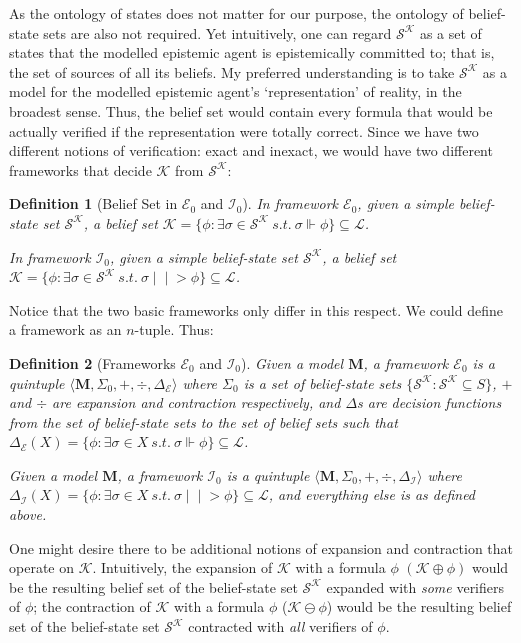 \documentclass[12pt]{article}
\newtheorem{definition}{Definition}[section]
\newcommand{\ver}{\Vdash}
\newcommand{\inever}{\mid \! \mid \!\!>}
\newcommand{\K}{\mathcal{K}}
\newcommand{\SK}{\mathcal{S}^\mathcal{K}}
\begin{document}
\par
As the ontology of states does not matter for our purpose, the ontology of belief-state sets are also not required. Yet intuitively, one can regard $\SK$ as a set of states that the modelled epistemic agent is epistemically committed to; that is, the set of sources of all its beliefs. My preferred understanding is to take $\SK$ as a model for the modelled epistemic agent's `representation' of reality, in the broadest sense. Thus, the belief set would contain every formula that would be actually verified if the representation were totally correct. Since we have two different notions of verification: exact and inexact, we would have two different frameworks that decide $\K$ from $\SK$:
\begin{definition}[Belief Set in $\mathcal{E}_0$ and $\mathcal{I}_0$] In framework $\mathcal{E}_0$, given a simple belief-state set $\SK$, a belief set $\K = \{\phi : \exists \sigma\in\SK \ s.t. \ \sigma \ver \phi \} \subseteq \mathcal{L}$. 
\par
In framework $\mathcal{I}_0$, given a simple belief-state set $\SK$, a belief set $\K = \{\phi : \exists \sigma\in\SK \ s.t. \ \sigma \inever \phi \} \subseteq \mathcal{L}$. 
\end{definition}
Notice that the two basic frameworks only differ in this respect. We could define a framework as an $n$-tuple. Thus:
\begin{definition}[Frameworks $\mathcal{E}_0$ and $\mathcal{I}_0$]
    Given a model $\bm{M}$, a framework $\mathcal{E}_0$ is a quintuple $\langle \bm{M}, \Sigma_0, +, \div, \Delta_{\mathcal{E}} \rangle$ where $\Sigma_0$ is a set of belief-state sets $\{\SK: \SK \subseteq S\}$, $+$ and $\div$ are expansion and contraction respectively, and $\Delta$s are decision functions from the set of belief-state sets to the set of belief sets such that $\Delta_{\mathcal{E}} (X) = \{\phi : \exists \sigma\in X \ s.t. \ \sigma \ver \phi \} \subseteq \mathcal{L}$.
    \par
    Given a model $\bm{M}$, a framework $\mathcal{I}_0$ is a quintuple $\langle \bm{M}, \Sigma_0, +, \div, \Delta_{\mathcal{I}} \rangle$ where $\Delta_{\mathcal{I}} (X) = \{\phi : \exists \sigma\in X \ s.t. \ \sigma \inever \phi \} \subseteq \mathcal{L}$, and everything else is as defined above. 
\end{definition}
\par
One might desire there to be additional notions of expansion and contraction that operate on $\K$. Intuitively, the expansion of $\K$ with a formula $\phi$ $(\K \oplus \phi)$ would be the resulting belief set of the belief-state set $\SK$ expanded with \textit{some} verifiers of $\phi$; the contraction of $\K$ with a formula $\phi$ ($\K \ominus \phi$) would be the resulting belief set of the belief-state set $\SK$ contracted with \textit{all} verifiers of $\phi$. 
\end{document}
